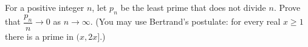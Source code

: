 For a positive integer $n$, let $p_n$ be the least prime that does not divide $n$. Prove that $\dfrac{p_n}{n}\to0$ as $n\to\infty$. (You may use Bertrand's postulate: for every real $x\ge1$ there is a prime in $(x,2x]$.)
